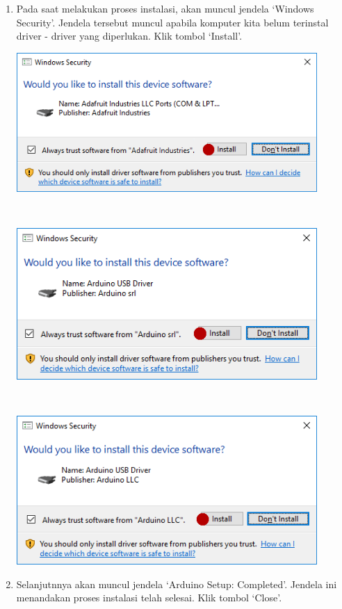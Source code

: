 \begin{enumerate}
\item Pada saat melakukan proses instalasi, akan muncul jendela `Windows Security'. Jendela tersebut muncul apabila komputer kita belum terinstal driver - driver yang diperlukan. Klik tombol `Install'.
\break\\
\centerline{\includegraphics[width=0.9\textwidth]{figures/aride5.png}}
\break\\
\centerline{\includegraphics[width=0.9\textwidth]{figures/aride6.png}}
\break\\
\centerline{\includegraphics[width=0.9\textwidth]{figures/aride7.png}}
\item Selanjutnnya akan muncul jendela `Arduino Setup: Completed'. Jendela ini menandakan proses instalasi telah selesai. Klik tombol `Close'.
\break\\

\end{enumerate}
